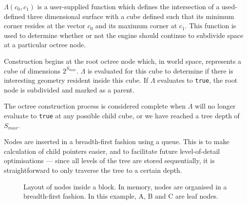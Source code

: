 $\Lambda(c_0, c_1)$ is a user-supplied function which defines the intersection of a used-defined three dimensional surface with a cube defined such that its minimum corner resides at the vector $c_0$ and its maximum corner at $c_1$. This function is used to determine whether or not the engine should continue to subdivide space at a particular octree node.

Construction begins at the root octree node which, in world space, represents a cube of dimensions $2^{S_{max}}$. $\Lambda$ is evaluated for this cube to determine if there is interesting geometry resident inside this cube. If $\Lambda$ evaluates to \texttt{true}, the root node is subdivided and marked as a parent.

The octree construction process is considered complete when $\Lambda$ will no longer evaluate to \texttt{true} at any possible child cube, or we have reached a tree depth of $S_{max}$.

Nodes are inserted in a breadth-first fashion using a queue. This is to make calculation of child pointers easier, and to facilitate future level-of-detail optimisations --- since all levels of the tree are stored sequentially, it is straightforward to only traverse the tree to a certain depth.

\begin{figure}[ht]
    \centering
    \footnotesize
    
    \caption{Layout of nodes inside a block. In memory, nodes are organised in a breadth-first fashion. In this example, A, B and C are leaf nodes.}
    \label{fig:quadtree_analogue}
\end{figure}
